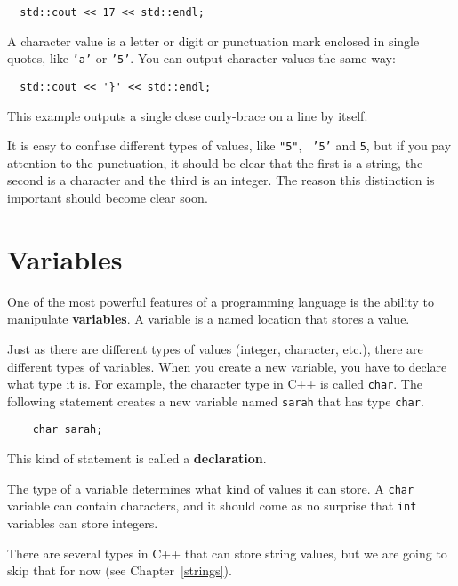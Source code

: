 \begin{lstlisting}
  std::cout << 17 << std::endl;
\end{lstlisting}

A character value is a letter or digit or punctuation mark
enclosed in single quotes, like {\tt 'a'} or {\tt '5'}.
You can output character values the same way:


\begin{lstlisting}
  std::cout << '}' << std::endl;
\end{lstlisting}

This example outputs a single close curly-brace on a line
by itself.

It is easy to confuse different types of values, like {\tt "5"}, {\tt
'5'} and {\tt 5}, but if you pay attention to the punctuation, it
should be clear that the first is a string, the second is a character
and the third is an integer.  The reason this distinction is important
should become clear soon.

\section {Variables}

One of the most powerful features of a programming language is the
ability to manipulate {\bf variables}.  A variable is a named location
that stores a value.  

Just as there are different types of values (integer, character,
etc.), there are different types of variables.  When you create a new
variable, you have to declare what type it is.  For example, the
character type in C++ is called {\tt char}.  The following statement
creates a new variable named {\tt sarah} that has type {\tt char}.

\begin{lstlisting}
    char sarah;
\end{lstlisting}

This kind of statement is called a {\bf declaration}.

The type of a variable determines what kind of values it can
store.  A {\tt char} variable can contain characters, and it should
come as no surprise that {\tt int} variables can store integers.

There are several types in C++ that can store string values, but we
are going to skip that for now (see Chapter~\ref{strings}).


